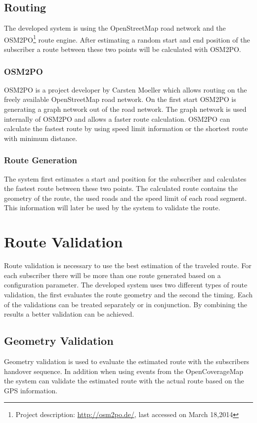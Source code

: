 \documentclass[master,english]{hgbthesis}
\begin{document}
\subsection{Routing}
The developed system is using the OpenStreetMap road network and the OSM2PO\footnote{Project description: \url{http://osm2po.de/}, last accessed on March 18,2014} route engine. After estimating a random start and end position of the subscriber a route between these two points will be calculated with OSM2PO.
\subsubsection{OSM2PO}
OSM2PO is a project developer by Carsten Moeller which allows routing on the freely available OpenStreetMap road network. On the first start OSM2PO is generating a graph network out of the road network. The graph network is used internally of OSM2PO and allows a faster route calculation. OSM2PO can calculate the fastest route by using speed limit information or the shortest route with minimum distance.
\subsubsection{Route Generation}
The system first estimates a start and position for the subscriber and calculates the fastest route between these two points. The calculated route contains the geometry of the route, the used roads and the speed limit of each road segment. This information will later be used by the system to validate the route.
\section{Route Validation}
\label{sec:routevalidation}
Route validation is necessary to use the best estimation of the traveled route. For each subscriber there will be more than one route generated based on a configuration parameter. The developed system uses two different types of route validation, the first evaluates the route geometry and the second the timing. Each of the validations can be treated separately or in conjunction. By combining the results a better validation can be achieved.
\subsection{Geometry Validation}
Geometry validation is used to evaluate the estimated route with the subscribers handover sequence. In addition when using events from the OpenCoverageMap the system can validate the estimated route with the actual route based on the GPS information.
\end{document}
